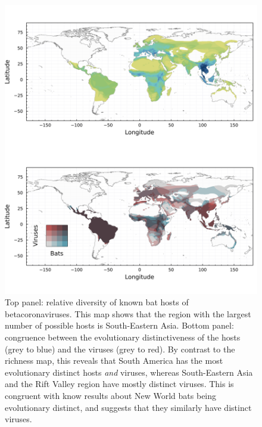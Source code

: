 \documentclass[10pt,oneside]{article}
\makeatletter
\def\maxwidth{\ifdim\Gin@nat@width>\linewidth\linewidth
\else\Gin@nat@width\fi}
\let\Oldincludegraphics\includegraphics
\renewcommand{\includegraphics}[1]{\Oldincludegraphics[width=\maxwidth]{#1}}
\makeatother
\begin{document}
\begin{figure}
\hypertarget{fig:richness}{%
\centering
\includegraphics{figures/combined_richness.png}
\caption{Top panel: relative diversity of known bat hosts of
betacoronaviruses. This map shows that the region with the largest
number of possible hosts is South-Eastern Asia. Bottom panel: congruence
between the evolutionary distinctiveness of the hosts (grey to blue) and
the viruses (grey to red). By contrast to the richness map, this reveals
that South America has the most evolutionary distinct hosts \emph{and}
viruses, whereas South-Eastern Asia and the Rift Valley region have
mostly distinct viruses. This is congruent with know results about New
World bats being evolutionary distinct, and suggests that they similarly
have distinct viruses.}\label{fig:richness}
}
\end{figure}
\end{document}
